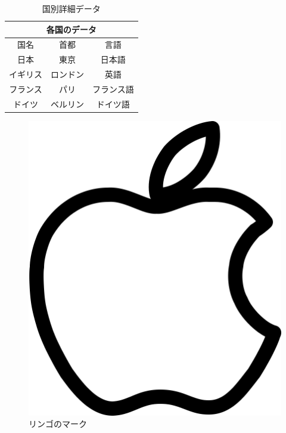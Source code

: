 \documentclass[a4j]{jarticle}
\begin{document}
\begin{table}[htb] %
    \caption{国別詳細データ} %
    \label{kuni-data}
    \begin{center} %
        \begin{tabular}{|c|c|c|} %
            \hline
            \multicolumn{3}{|c|}{各国のデータ}\\ 
            \hline %
            国名&首都&言語\\ 
            \hline
            日本&東京&日本語\\ 
            \hline
            イギリス&ロンドン&英語\\ 
            \hline
            フランス&パリ&フランス語\\
            \hline
            ドイツ&ベルリン&ドイツ語\\
            \hline
        \end{tabular}
    \end{center}
\end{table}

\begin{figure}[htb]
    \begin{center}
        \includegraphics[scale=0.5]{apple01.png}
        \caption{リンゴのマーク} %
        \label{apple_mark}
    \end{center}
\end{figure}
\end{document}
